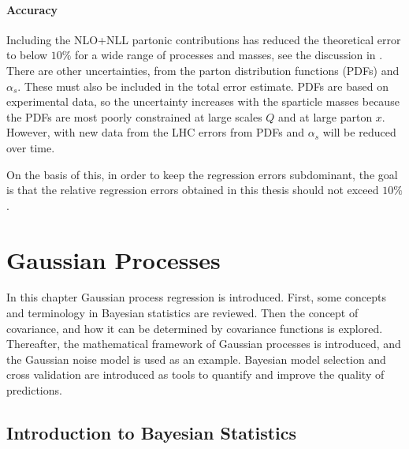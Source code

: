 \documentclass[twoside,english]{uiofysmaster}
\makeatletter
\newenvironment{chapquote}[2][2em]
  {\setlength{\@tempdima}{#1}%
   \def\chapquote@author{#2}%
   \parshape 1 \@tempdima \dimexpr\textwidth-2\@tempdima\relax%
   \itshape}
  {\par\normalfont\hfill--\ \chapquote@author\hspace*{\@tempdima}\par\bigskip}
\makeatother
\begin{document}
{{\subsubsection{Accuracy}

Including the NLO+NLL partonic contributions has reduced the theoretical error to below $10 \%$ for a wide range of processes and masses, see the discussion in \cite{Balazs:2017moi}. There are other uncertainties, from the parton distribution functions (PDFs) and $\alpha_s$. These must also be included in the total error estimate. PDFs are based on experimental data, so the uncertainty increases with the sparticle masses because the PDFs are most poorly constrained at large scales $Q$ and at large parton $x$. However, with new data from the LHC errors from PDFs and $\alpha_s$ will be reduced over time.

On the basis of this, in order to keep the regression errors subdominant, the goal is that the relative regression errors obtained in this thesis should not exceed $10 \%$.







\chapter{Gaussian Processes}\label{Chapter:Gaussian Processes}



In this chapter Gaussian process regression is introduced. First, some concepts and terminology in Bayesian statistics are reviewed. Then the concept of covariance, and how it can be determined by covariance functions is explored. Thereafter, the mathematical framework of Gaussian processes is introduced, and the Gaussian noise model is used as an example. Bayesian model selection and cross validation are introduced as tools to quantify and improve the quality of predictions.

\section{Introduction to Bayesian Statistics}

}}
\end{document}
